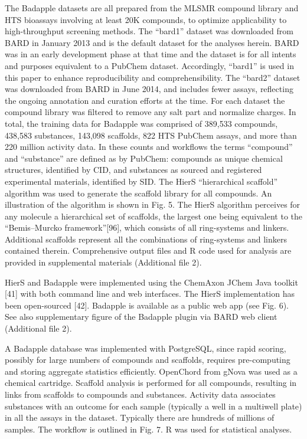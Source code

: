 The Badapple datasets are all prepared from the MLSMR compound library and HTS bioassays involving at least 20K compounds, to optimize applicability to high-throughput screening methods. The “bard1” dataset was downloaded from BARD in January 2013 and is the default dataset for the analyses herein. BARD was in an early development phase at that time and the dataset is for all intents and purposes equivalent to a PubChem dataset. Accordingly, “bard1” is used in this paper to enhance reproducibility and comprehensibility. The “bard2” dataset was downloaded from BARD in June 2014, and includes fewer assays, reflecting the ongoing annotation and curation efforts at the time. For each dataset the compound library was filtered to remove any salt part and normalize charges. In total, the training data for Badapple was comprised of 389,533 compounds, 438,583 substances, 143,098 scaffolds, 822 HTS PubChem assays, and more than 220 million activity data. In these counts and workflows the terms “compound” and “substance” are defined as by PubChem: compounds as unique chemical structures, identified by CID, and substances as sourced and registered experimental materials, identified by SID. The HierS “hierarchical scaffold” algorithm was used to generate the scaffold library for all compounds. An illustration of the algorithm is shown in Fig. 5. The HierS algorithm perceives for any molecule a hierarchical set of scaffolds, the largest one being equivalent to the “Bemis–Murcko framework”[96], which consists of all ring-systems and linkers. Additional scaffolds represent all the combinations of ring-systems and linkers contained therein. Comprehensive output files and R code used for analysis are provided in supplemental materials (Additional file 2).

HierS and Badapple were implemented using the ChemAxon JChem Java toolkit [41] with both command line and web interfaces. The HierS implementation has been open-sourced [42]. Badapple is available as a public web app (see Fig. 6). See also supplementary figure of the Badapple plugin via BARD web client (Additional file 2).

A Badapple database was implemented with PostgreSQL, since rapid scoring, possibly for large numbers of compounds and scaffolds, requires pre-computing and storing aggregate statistics efficiently. OpenChord from gNova was used as a chemical cartridge. Scaffold analysis is performed for all compounds, resulting in links from scaffolds to compounds and substances. Activity data associates substances with an outcome for each sample (typically a well in a multiwell plate) in all the assays in the dataset. Typically there are hundreds of millions of samples. The workflow is outlined in Fig. 7. R was used for statistical analyses.

